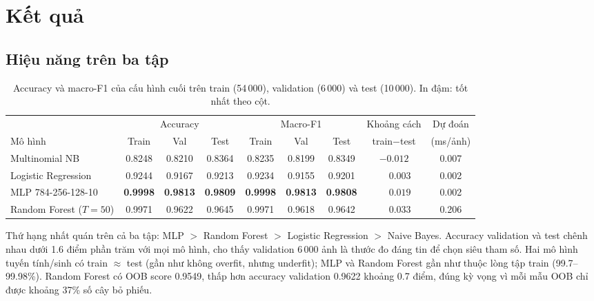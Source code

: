 \section{Kết quả}
 
\subsection{Hiệu năng trên ba tập}
 
\begin{table}[H]
\centering\small
\caption{Accuracy và macro-F1 của cấu hình cuối trên train (54\,000), validation (6\,000) và test (10\,000). In đậm: tốt nhất theo cột.}\label{tab:main}
\setlength{\tabcolsep}{4pt}
\begin{tabular}{@{}lcccccccc@{}}
\toprule
& \multicolumn{3}{c}{Accuracy} & \multicolumn{3}{c}{Macro-F1} & Khoảng cách & Dự đoán \\
\cmidrule(lr){2-4}\cmidrule(lr){5-7}
Mô hình & Train & Val & Test & Train & Val & Test & train$-$test & (ms/ảnh) \\
\midrule
Multinomial NB      & 0.8248 & 0.8210 & 0.8364 & 0.8235 & 0.8199 & 0.8349 & $-0.012$ & 0.007 \\
Logistic Regression & 0.9244 & 0.9167 & 0.9213 & 0.9234 & 0.9155 & 0.9201 & $\phantom{-}0.003$ & 0.002 \\
MLP 784-256-128-10  & \textbf{0.9998} & \textbf{0.9813} & \textbf{0.9809} & \textbf{0.9998} & \textbf{0.9813} & \textbf{0.9808} & $\phantom{-}0.019$ & 0.002 \\
Random Forest ($T{=}50$) & 0.9971 & 0.9622 & 0.9645 & 0.9971 & 0.9618 & 0.9642 & $\phantom{-}0.033$ & 0.206 \\
\bottomrule
\end{tabular}
\end{table}
 
Thứ hạng nhất quán trên cả ba tập: MLP $>$ Random Forest $>$ Logistic Regression $>$ Naive Bayes. Accuracy validation và test chênh nhau dưới 1.6 điểm phần trăm với mọi mô hình, cho thấy validation 6\,000 ảnh là thước đo đáng tin để chọn siêu tham số. Hai mô hình tuyến tính/sinh có train $\approx$ test (gần như không overfit, nhưng underfit); MLP và Random Forest gần như thuộc lòng tập train (99.7--99.98\%). Random Forest có OOB score 0.9549, thấp hơn accuracy validation 0.9622 khoảng 0.7 điểm, đúng kỳ vọng vì mỗi mẫu OOB chỉ được khoảng 37\% số cây bỏ phiếu.
 
